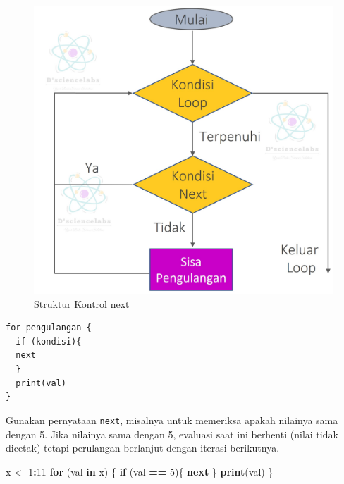\documentclass[
]{book}
\newenvironment{Shaded}{\begin{snugshade}}{\end{snugshade}}
\newcommand{\ControlFlowTok}[1]{\textcolor[rgb]{0.13,0.29,0.53}{\textbf{#1}}}
\newcommand{\DecValTok}[1]{\textcolor[rgb]{0.00,0.00,0.81}{#1}}
\newcommand{\FunctionTok}[1]{\textcolor[rgb]{0.13,0.29,0.53}{\textbf{#1}}}
\newcommand{\NormalTok}[1]{#1}
\newcommand{\OtherTok}[1]{\textcolor[rgb]{0.56,0.35,0.01}{#1}}
\newcommand{\SpecialCharTok}[1]{\textcolor[rgb]{0.81,0.36,0.00}{\textbf{#1}}}
\begin{document}
\begin{figure}

{\centering \includegraphics[width=1\linewidth]{./images/Bab6/next} 

}

\caption{Struktur Kontrol next}\label{fig:next}
\end{figure}

\begin{verbatim}
for pengulangan {
  if (kondisi){
  next
  }
  print(val)
}
\end{verbatim}

Gunakan pernyataan \texttt{next}, misalnya untuk memeriksa apakah nilainya sama dengan 5. Jika nilainya sama dengan 5, evaluasi saat ini berhenti (nilai tidak dicetak) tetapi perulangan berlanjut dengan iterasi berikutnya.

\begin{Shaded}
\begin{Highlighting}[]
\NormalTok{x }\OtherTok{\textless{}{-}} \DecValTok{1}\SpecialCharTok{:}\DecValTok{11}
 \ControlFlowTok{for}\NormalTok{ (val }\ControlFlowTok{in}\NormalTok{ x) \{}
 \ControlFlowTok{if}\NormalTok{ (val }\SpecialCharTok{==} \DecValTok{5}\NormalTok{)\{}
 \ControlFlowTok{next}
\NormalTok{ \}}
\FunctionTok{print}\NormalTok{(val)}
\NormalTok{\}}
\end{Highlighting}
\end{Shaded}
\end{document}
